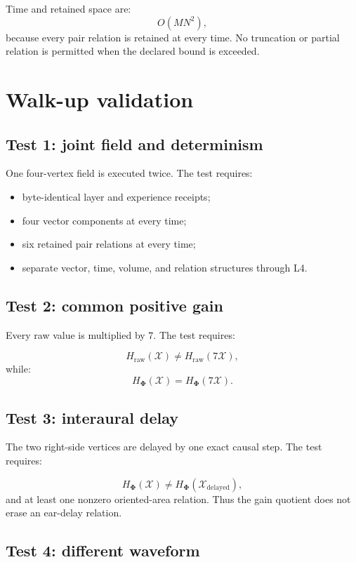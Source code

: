 \documentclass[11pt]{article}
\newcommand{\VTVR}{\boldsymbol{\Phi}}
\begin{document}
Time and retained space are:
\[
  O(MN^2),
\]
because every pair relation is retained at every time. No truncation or
partial relation is permitted when the declared bound is exceeded.

\section{Walk-up validation}

\subsection{Test 1: joint field and determinism}

One four-vertex field is executed twice. The test requires:

\begin{itemize}[nosep]
  \item byte-identical layer and experience receipts;
  \item four vector components at every time;
  \item six retained pair relations at every time;
  \item separate vector, time, volume, and relation structures through L4.
\end{itemize}

\subsection{Test 2: common positive gain}

Every raw value is multiplied by \(7\). The test requires:

\[
  H_{\mathrm{raw}}(\mathcal{X})
  \neq
  H_{\mathrm{raw}}(7\mathcal{X}),
\]
while:
\[
  H_{\VTVR}(\mathcal{X})
  =
  H_{\VTVR}(7\mathcal{X}).
\]

\subsection{Test 3: interaural delay}

The two right-side vertices are delayed by one exact causal step. The test
requires:

\[
  H_{\VTVR}(\mathcal{X})
  \neq
  H_{\VTVR}(\mathcal{X}_{\mathrm{delayed}}),
\]
and at least one nonzero oriented-area relation. Thus the gain quotient does
not erase an ear-delay relation.

\subsection{Test 4: different waveform}
\end{document}
